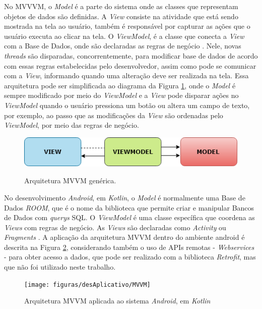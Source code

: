 No MVVVM, o \textit{Model} é a parte do sistema onde as classes que representam objetos de dados são definidas. A \textit{View} consiste na atividade que está sendo mostrada na tela ao usuário, também é responsável por capturar as ações que o usuário executa ao clicar na tela. O \textit{ViewModel}, é a classe que conecta a \textit{View} com a Base de Dados, onde são declaradas as regras de negócio \cite{site:MVVM}. Nele, novas \textit{threads} são disparadas, concorrentemente, para modificar base de dados de acordo com essas regras estabelecidas pelo desenvolvedor, assim como pode se comunicar com a \textit{View}, informando quando uma alteração deve ser realizada na tela. Essa arquitetura pode ser simplificada ao diagrama da Figura \ref{fig:MVVMarc}, onde o \textit{Model} é sempre modificado por meio do \textit{ViewModel} e a \textit{View} pode disparar ações no \textit{ViewModel} quando o usuário pressiona um botão ou altera um campo de texto, por exemplo, ao passo que as modificações da \textit{View} são ordenadas pelo \textit{ViewModel}, por meio das regras de negócio.

\begin{figure}[htb]
	\centering
	\caption{Arquitetura MVVM genérica.}
	\includegraphics[width=0.45\linewidth]{figuras/desAplicativo/MVVMarc}
	\label{fig:MVVMarc}
\end{figure}


No desenvolvimento \textit{Android}, em \textit{Kotlin}, o \textit{Model} é normalmente uma Base de Dados \textit{ROOM}, que é o nome da biblioteca que permite criar e manipular Bancos de Dados com \textit{querys} SQL. O \textit{ViewModel} é uma classe específica que coordena as \textit{Views} com regras de negócio. As \textit{Views} são declaradas como \textit{Activity} ou \textit{Fragments} \cite{site:MVVM}. A aplicação da arquitetura MVVM dentro do ambiente android é descrita na Figura \ref{fig:MVVM}, considerando também o uso de APIs remotas - \textit{Webservices} - para obter acesso a dados, que pode ser realizado com a biblioteca \textit{Retrofit}, mas que não foi utilizado neste trabalho. 

\begin{figure}[htb]
	\centering
	\caption{Arquitetura MVVM aplicada ao sistema \textit{Android}, em \textit{Kotlin}}
	\texttt{[image: figuras/desAplicativo/MVVM]}
	\label{fig:MVVM}
\end{figure}

